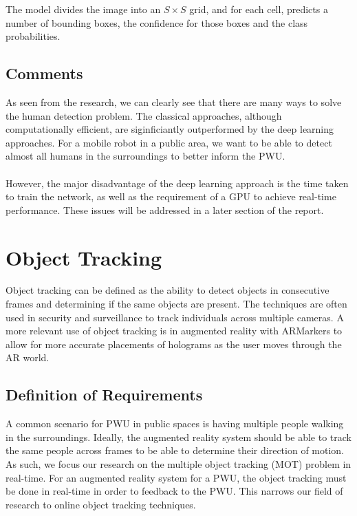The model divides the image into an $S \times S$ grid, and for each cell, predicts a number of bounding boxes, the confidence for those boxes and the class probabilities.

\subsection{Comments}
As seen from the research, we can clearly see that there are many ways to solve the human detection problem. The classical approaches, although computationally efficient, are siginficiantly outperformed by the deep learning approaches. For a mobile robot in a public area, we want to be able to detect almost all humans in the surroundings to better inform the PWU.

\paragraph{}However, the major disadvantage of the deep learning approach is the time taken to train the network, as well as the requirement of a GPU to achieve real-time performance. These issues will be addressed in a later section of the report.

\section{Object Tracking}
Object tracking can be defined as the ability to detect objects in consecutive frames and determining if the same objects are present. The techniques are often used in security and surveillance to track individuals across multiple cameras. A more relevant use of object tracking is in augmented reality with ARMarkers to allow for more accurate placements of holograms as the user moves through the AR world.

\subsection{Definition of Requirements}
 A common scenario for PWU in public spaces is having multiple people walking in the surroundings. Ideally, the augmented reality system should be able to track the same people across frames to be able to determine their direction of motion. As such, we focus our research on the multiple object tracking (MOT) problem in real-time. For an augmented reality system for a PWU, the object tracking must be done in real-time in order to feedback to the PWU. This narrows our field of research to online object tracking techniques.
 

